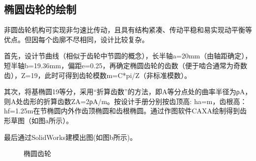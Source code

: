 \documentclass[12pt]{article}
\begin{document}
\begin{CJK}{UTF8}{gbsn}
\subsection{椭圆齿轮的绘制}
非圆齿轮机构可实现非匀速比传动，且具有结构紧凑、传动平稳和易实现动平衡等优点。但因每个齿廓不尽相同，设计比较复杂。\par
首先，设计节曲线（相似于齿轮中节圆的概念），长半轴a=20mm（由轴距确定），短半轴b=19.36mm，偏距e=0.25，再确定椭圆齿轮的齿数（便于啮合通常为奇数齿），Z=19，此时可得到齿轮模数m=C*pi/Z（非标准模数）。\par
其次，将基椭圆19等分，采用“折算齿数”的方法，即A等分点处的曲率半径为ρA，则A处齿形的折算齿数ZA=2ρA/m。按设计手册分别按齿顶高: ha=m，齿根高：hf=1.25m在节椭圆内外作齿顶椭圆和齿根椭圆。通过作图软件CAXA绘制得到齿形草图（如图a所示）。\par
最后通过SolidWorks建模出图(如图b所示)。
\begin{figure}[H]
{}
\quad
{}
\caption{椭圆齿轮}
\end{figure}


\end{CJK}
\end{document}

